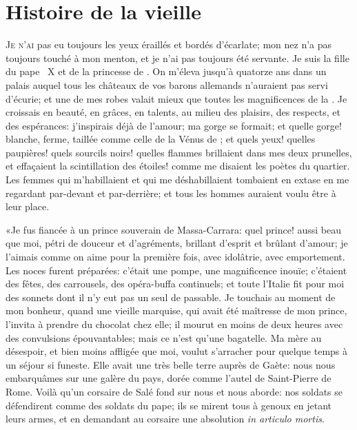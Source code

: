 \chapter{Histoire de la vieille}


\lettrine[ante=«]{J}{e n’ai} pas eu toujours les yeux éraillés et bordés d’écarlate; mon nez
n’a pas toujours touché à mon menton, et je n’ai pas toujours été
servante. Je suis la fille du pape ~X et de la princesse de
. 
On m’éleva jusqu’à quatorze ans dans un palais auquel
tous les châteaux de vos barons allemands n’auraient pas servi
d’écurie; et une de mes robes valait mieux que toutes les magnificences
de la . Je croissais en beauté, en grâces, en talents, au
milieu des plaisirs, des respects, et des espérances: j’inspirais déjà
de l’amour; ma gorge se formait; et quelle gorge! blanche, ferme,
taillée comme celle de la Vénus de ; et quels yeux! quelles
paupières! quels sourcils noirs! quelles flammes brillaient dans mes
deux prunelles, et effaçaient la scintillation des étoiles! comme me
disaient les poètes du quartier. Les femmes qui m’habillaient et qui me
déshabillaient tombaient en extase en me regardant par-devant et
par-derrière; et tous les hommes auraient voulu être à leur place.


«Je fus fiancée à un prince souverain de Massa-Carrara: quel prince!
aussi beau que moi, pétri de douceur et d’agréments, brillant d’esprit
et brûlant d’amour; je l’aimais comme on aime pour la première fois,
avec idolâtrie, avec emportement. Les noces furent préparées: c’était
une pompe, une magnificence inouïe; c’étaient des fêtes, des
carrousels, des opéra-buffa continuels; et toute l’Italie fit pour moi
des sonnets dont il n’y eut pas un seul de passable. Je touchais au 
moment 
de mon bonheur, quand une vieille marquise, qui avait été
maîtresse de mon prince, l’invita à prendre du chocolat chez elle; il
mourut en moins de deux heures avec des convulsions épouvantables; mais
ce n’est qu’une bagatelle. Ma mère au désespoir, et bien moins affligée
que moi, voulut s’arracher pour quelque temps à un séjour si funeste.
Elle avait une très belle terre auprès de Gaète: nous nous embarquâmes
sur une galère du pays, dorée comme l’autel de Saint-Pierre de Rome.
Voilà qu’un corsaire de Salé fond sur nous et nous aborde: nos soldats
se défendirent comme des soldats du pape; ils se mirent tous à genoux
en jetant leurs armes, et en demandant au corsaire une absolution \emph{in
articulo mortis}.

